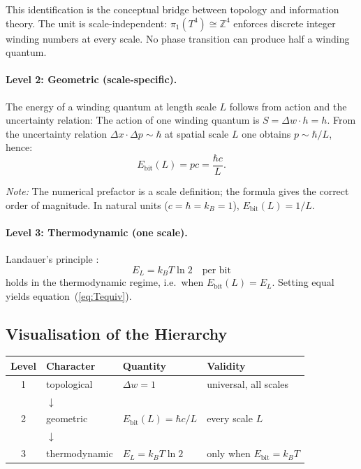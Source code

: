 This identification is the conceptual bridge between
topology and information theory.
The unit is scale-independent: \(\pi_1(T^4) \cong \mathbb{Z}^4\)
enforces discrete integer winding numbers at every scale.
No phase transition can produce half a winding quantum.

\paragraph{Level 2: Geometric (scale-specific).}

The energy of a winding quantum at length scale \(L\) follows
from action and the uncertainty relation:
The action of one winding quantum is \(S = \Delta w \cdot h = h\).
From the uncertainty relation \(\Delta x \cdot \Delta p \sim \hbar\)
at spatial scale \(L\) one obtains \(p \sim \hbar/L\), hence:
\begin{equation}
  E_\text{bit}(L) = pc = \frac{\hbar c}{L}.
  \label{eq:Ebit}
\end{equation}

\textit{Note:} The numerical prefactor is a scale definition;
the formula gives the correct order of magnitude.
In natural units (\(c = \hbar = k_B = 1\)), \(E_\text{bit}(L) = 1/L\).

\paragraph{Level 3: Thermodynamic (one scale).}

Landauer's principle \cite{Landauer1961}:
\begin{equation}
  E_L = k_B T \ln 2 \quad \text{per bit}
  \label{eq:Landauer}
\end{equation}
holds in the thermodynamic regime, i.e.\ when
\(E_\text{bit}(L) = E_L\).
Setting equal yields equation~(\ref{eq:Tequiv}).

\subsection{Visualisation of the Hierarchy}

\begin{center}
\renewcommand{\arraystretch}{1.6}
\begin{tabular}{clll}
\toprule
\textbf{Level} & \textbf{Character} & \textbf{Quantity} & \textbf{Validity} \\
\midrule
1 & topological   & \(\Delta w = 1\)                & universal, all scales \\
  & \(\downarrow\) & & \\
2 & geometric     & \(E_\text{bit}(L) = \hbar c/L\) & every scale \(L\) \\
  & \(\downarrow\) & & \\
3 & thermodynamic & \(E_L = k_BT\ln2\)             & only when \(E_\text{bit} = k_BT\) \\
\bottomrule
\end{tabular}
\end{center}

